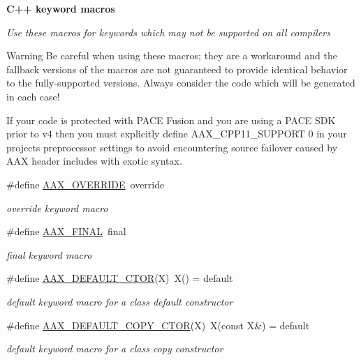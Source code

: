 \begin{Indent}{\bf C++ keyword macros}\par
{\em Use these macros for keywords which may not be supported on all compilers

\begin{DoxyWarning}{Warning}
Be careful when using these macros; they are a workaround and the fallback versions of the macros are not guaranteed to provide identical behavior to the fully-\/supported versions. Always consider the code which will be generated in each case!

If your code is protected with P\+A\+C\+E Fusion and you are using a P\+A\+C\+E S\+D\+K prior to v4 then you must explicitly define {\ttfamily A\+A\+X\+\_\+\+C\+P\+P11\+\_\+\+S\+U\+P\+P\+O\+R\+T 0} in your project\textquotesingle{}s preprocessor settings to avoid encountering source failover caused by A\+A\+X header includes with exotic syntax.
\end{DoxyWarning}
}\begin{DoxyCompactItemize}
\item 
\#define \hyperlink{a00149_ac2f24a5172689ae684344abdcce55463}{A\+A\+X\+\_\+\+O\+V\+E\+R\+R\+I\+D\+E}~override
\begin{DoxyCompactList}\small\item\em {\ttfamily override} keyword macro \end{DoxyCompactList}\item 
\#define \hyperlink{a00149_aa4da4a09e940c332a2205e34e0677f40}{A\+A\+X\+\_\+\+F\+I\+N\+A\+L}~final
\begin{DoxyCompactList}\small\item\em {\ttfamily final} keyword macro \end{DoxyCompactList}\item 
\#define \hyperlink{a00149_a5ed9499b8cd7549adf991d46dfbe749b}{A\+A\+X\+\_\+\+D\+E\+F\+A\+U\+L\+T\+\_\+\+C\+T\+O\+R}(X)~X() = default
\begin{DoxyCompactList}\small\item\em {\ttfamily default} keyword macro for a class default constructor \end{DoxyCompactList}\item 
\#define \hyperlink{a00149_a608ab9e59f8f54c32e68fe0d32e9b991}{A\+A\+X\+\_\+\+D\+E\+F\+A\+U\+L\+T\+\_\+\+C\+O\+P\+Y\+\_\+\+C\+T\+O\+R}(X)~X(const X\&) = default
\begin{DoxyCompactList}\small\item\em {\ttfamily default} keyword macro for a class copy constructor \end{DoxyCompactList}\item 

\end{DoxyCompactItemize}
\end{Indent}

